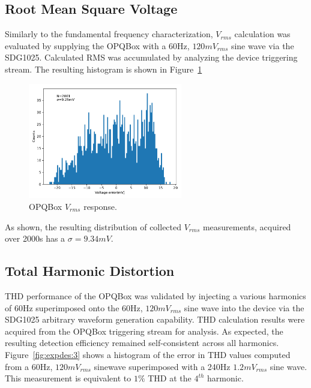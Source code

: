 \subsection{Root Mean Square Voltage}
Similarly to the fundamental frequency characterization, $V_{rms}$ calculation was evaluated by supplying the OPQBox with a 60Hz, $120mV_{rms}$ sine wave via the SDG1025.
Calculated RMS was accumulated by analyzing the device triggering stream.
The resulting histogram is shown in Figure~\ref{fig:expdes:2}

\begin{figure}[ht!]
    \begin{center}
        \includegraphics[width=0.6\textwidth]{img/box_eval/rms_histogram.pdf}
    \end{center}
    \caption{OPQBox $V_{rms}$ response.}
    \label{fig:expdes:2}
\end{figure}

As shown, the resulting distribution of collected $V_{rms}$ measurements, acquired over 2000s has a $\sigma=9.34mV$.

\subsection{Total Harmonic Distortion}

THD performance of the OPQBox was validated by injecting a various harmonics of 60Hz superimposed onto the 60Hz, $120mV_{rms}$ sine wave into the device via the SDG1025 arbitrary waveform generation capability.
THD calculation results were acquired from the OPQBox triggering stream for analysis.
As expected, the resulting detection efficiency remained self-consistent across all harmonics.
Figure~\ref{fig:expdes:3} shows a histogram of the error in THD values computed from a 60Hz, $120mV_{rms}$ sinewave superimposed with a 240Hz $1.2mV_{rms}$ sine wave.
This measurement is equivalent to $1\%$ THD at the $4^{th}$ harmonic.

